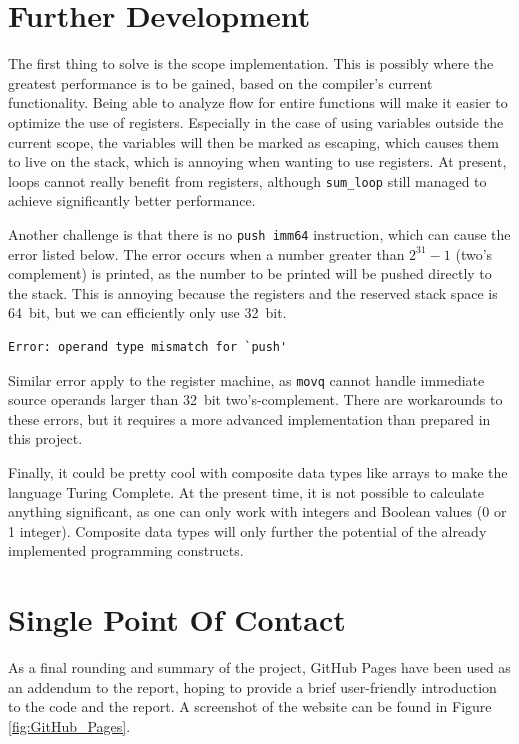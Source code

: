 \section{Further Development}
The first thing to solve is the scope implementation. This is possibly where the greatest performance is to be gained, based on the compiler's current functionality. Being able to analyze flow for entire functions will make it easier to optimize the use of registers. Especially in the case of using variables outside the current scope, the variables will then be marked as escaping, which causes them to live on the stack, which is annoying when wanting to use registers. At present, loops cannot really benefit from registers, although \texttt{sum\_loop} still managed to achieve significantly better performance.

Another challenge is that there is no \texttt{push imm64} instruction, which can cause the error listed below. The error occurs when a number greater than $2^{31} - 1$ (two's complement) is printed, as the number to be printed will be pushed directly to the stack. This is annoying because the registers and the reserved stack space is \SI{64}{bit}, but we can efficiently only use \SI{32}{bit}.

\begin{verbatim}
Error: operand type mismatch for `push'
\end{verbatim}

Similar error apply to the register machine, as \texttt{movq} cannot handle immediate source operands larger than \SI{32}{bit} two's-complement. There are workarounds to these errors, but it requires a more advanced implementation than prepared in this project. 

Finally, it could be pretty cool with composite data types like arrays to make the language Turing Complete. At the present time, it is not possible to calculate anything significant, as one can only work with integers and Boolean values (0 or 1 integer). Composite data types will only further the potential of the already implemented programming constructs.


\section{Single Point Of Contact}
As a final rounding and summary of the project, GitHub Pages have been used as an addendum to the report, hoping to provide a brief user-friendly introduction to the code and the report. A screenshot of the website can be found in Figure \ref{fig:GitHub_Pages}.

